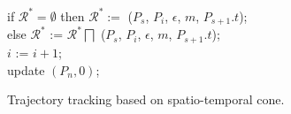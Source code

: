 \begin{figure}[tb!]
\begin{center}
{\begin{minipage}{3.3in}
{					\icc \>\hspace{3ex} if $\mathcal{R}^*=\emptyset$ then $\mathcal{R}^*:=$ ($P_s$, $P_{i}$, $\epsilon$, $m$, $P_{s+1}.t$); \\
					\icc \>\hspace{3ex} else $\mathcal{R}^*$ := $\mathcal{R}^*\bigsqcap$ ($P_s$, $P_{i}$, $\epsilon$, $m$, $P_{s+1}.t$); \\
					\icc \>\hspace{3ex} $i$ := $i +1$;	\\
					\icc \>\hspace{0ex} update $(P_{n}, 0)$; 
				}
				\vspace{-2ex}
				\myhrule
			\end{minipage}
		}
	\end{center}
	\vspace{-2ex}
	\caption{\small Trajectory tracking based on spatio-temporal cone.}
	\label{alg:citt-s-full}
	\vspace{-2ex}
\end{figure}


